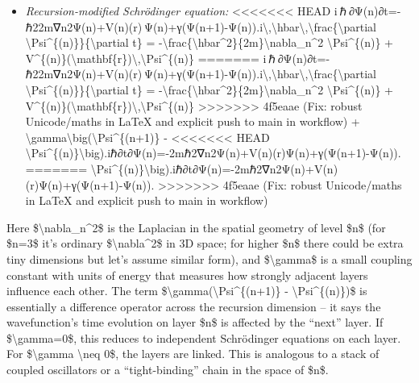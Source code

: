 \documentclass[]{article}
\begin{document}
\begin{itemize}
\item
  \emph{Recursion-modified Schrödinger equation:}
<<<<<<< HEAD
  i ℏ ∂Ψ(n)∂t=-ℏ22m∇n2Ψ(n)+V(n)(r) Ψ(n)+γ(Ψ(n+1)-Ψ(n)).i\textbackslash,\textbackslash hbar\textbackslash,\textbackslash frac\{\textbackslash partial
  \textbackslash Psi\^{}\{(n)\}\}\{\textbackslash partial t\} =
  -\textbackslash frac\{\textbackslash hbar\^{}2\}\{2m\}\textbackslash nabla\_n\^{}2
  \textbackslash Psi\^{}\{(n)\} +
  V\^{}\{(n)\}(\textbackslash mathbf\{r\})\textbackslash,\textbackslash Psi\^{}\{(n)\}
=======
  i ℏ ∂Ψ(n)∂t=-ℏ22m∇n2Ψ(n)+V(n)(r) Ψ(n)+γ(Ψ(n+1)-Ψ(n)).i\textbackslash{},\textbackslash{}hbar\textbackslash{},\textbackslash{}frac\{\textbackslash{}partial
  \textbackslash{}Psi\^{}\{(n)\}\}\{\textbackslash{}partial t\} =
  -\textbackslash{}frac\{\textbackslash{}hbar\^{}2\}\{2m\}\textbackslash{}nabla\_n\^{}2
  \textbackslash{}Psi\^{}\{(n)\} +
  V\^{}\{(n)\}(\textbackslash{}mathbf\{r\})\textbackslash{},\textbackslash{}Psi\^{}\{(n)\}
>>>>>>> 4f5eaae (Fix: robust Unicode/maths in LaTeX and explicit push to main in workflow)
  +
  \textbackslash{}gamma\textbackslash{}big(\textbackslash{}Psi\^{}\{(n+1)\}
  -
<<<<<<< HEAD
  \textbackslash Psi\^{}\{(n)\}\textbackslash big).iℏ∂t∂Ψ(n)\hspace{0pt}=-2mℏ2\hspace{0pt}∇n2\hspace{0pt}Ψ(n)+V(n)(r)Ψ(n)+γ(Ψ(n+1)-Ψ(n)).
=======
  \textbackslash{}Psi\^{}\{(n)\}\textbackslash{}big).iℏ∂t∂Ψ(n)​=-2mℏ2​∇n2​Ψ(n)+V(n)(r)Ψ(n)+γ(Ψ(n+1)-Ψ(n)).
>>>>>>> 4f5eaae (Fix: robust Unicode/maths in LaTeX and explicit push to main in workflow)
\end{itemize}

Here \$\textbackslash{}nabla\_n\^{}2\$ is the Laplacian in the spatial
geometry of level \$n\$ (for \$n=3\$ it's ordinary
\$\textbackslash{}nabla\^{}2\$ in 3D space; for higher \$n\$ there could
be extra tiny dimensions but let's assume similar form), and
\$\textbackslash{}gamma\$ is a small coupling constant with units of
energy that measures how strongly adjacent layers influence each other​.
The term \$\textbackslash{}gamma(\textbackslash{}Psi\^{}\{(n+1)\} -
\textbackslash{}Psi\^{}\{(n)\})\$ is essentially a difference operator
across the recursion dimension -- it says the wavefunction's time
evolution on layer \$n\$ is affected by the ``next'' layer. If
\$\textbackslash{}gamma=0\$, this reduces to independent Schrödinger
equations on each layer. For \$\textbackslash{}gamma \textbackslash{}neq
0\$, the layers are linked. This is analogous to a stack of coupled
oscillators or a ``tight-binding'' chain in the space of \$n\$​.
\end{document}
